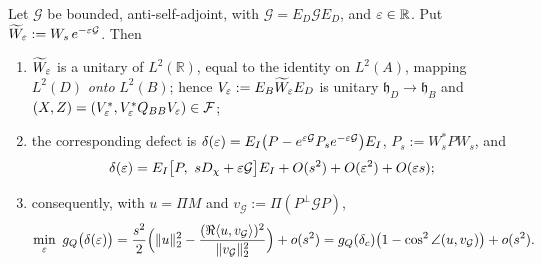 \documentclass[11pt]{article}
\begin{document}
\begin{lemma}\label{lem:orbit}
Let $\mathcal G$ be bounded, anti-self-adjoint, with $\mathcal G=E_D\mathcal GE_D$, and
$\varepsilon\in\mathbb R$.  Put $\widetilde W_\varepsilon:=W_s\,e^{-\varepsilon\mathcal G}$.  Then
\begin{enumerate}[leftmargin=1.6em,itemsep=1pt]
\item $\widetilde W_\varepsilon$ is a unitary of $L^2(\mathbb R)$, equal to the identity on
 $L^2(A)$, mapping $L^2(D)$ \emph{onto} $L^2(B)$; hence
 $V_\varepsilon:=E_B\widetilde W_\varepsilon E_D$ is unitary $\mathfrak h_D\to\mathfrak h_B$ and
 $(X,Z)=(V_\varepsilon^*,V_\varepsilon^*Q_{BB}V_\varepsilon)\in\mathcal F$;
\item the corresponding defect is
 $\delta(\varepsilon)=E_I\bigl(P-e^{\varepsilon\mathcal G}P_se^{-\varepsilon\mathcal G}\bigr)E_I$,
 $P_s:=W_s^*PW_s$, and
 \begin{equation}\label{eq:deleps}
  \delta(\varepsilon)=E_I\bigl[P,\ sD_\chi+\varepsilon\mathcal G\bigr]E_I
   +O(s^2)+O(\varepsilon^2)+O(\varepsilon s);
 \end{equation}
\item consequently, with $u=\Pi M$ and $v_{\mathcal G}:=\Pi(P^\perp\mathcal GP)$,
 \begin{equation}\label{eq:gain}
  \min_{\varepsilon}\ g_Q\bigl(\delta(\varepsilon)\bigr)
   =\frac{s^2}{2}\Bigl(\|u\|_2^2-\frac{(\Re\langle u,v_{\mathcal G}\rangle)^2}{\|v_{\mathcal G}\|_2^2}\Bigr)+o(s^2)
   =g_Q(\delta_c)\bigl(1-\cos^2\angle(u,v_{\mathcal G})\bigr)+o(s^2).
 \end{equation}
\end{enumerate}
\end{lemma}
\end{document}

